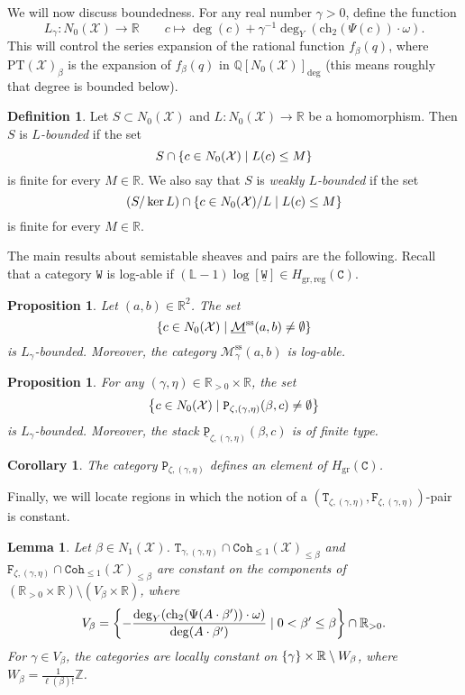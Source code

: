 \documentclass{amsart}
\newtheorem{cor}[thm]{Corollary}
\newtheorem{prop}[thm]{Proposition}
\newtheorem{lem}[thm]{Lemma}
\theoremstyle{definition}
\newtheorem{defn}[thm]{Definition}
\theoremstyle{remark}
\theoremstyle{plain}
\theoremstyle{definition}
\theoremstyle{remark}
\newcommand{\R}{\mathbb{R}}
\newcommand{\Z}{\mathbb{Z}}
\newcommand{\Q}{\mathbb{Q}}
\renewcommand{\L}{\mathbb{L}}
\newcommand{\mc}[1]{\mathcal{#1}}
\newcommand{\mr}[1]{\mathrm{#1}}
\newcommand{\on}[1]{\operatorname{#1}}
\newcommand{\mt}[1]{\mathtt{#1}}
\newcommand{\ul}[1]{\underline{#1}}
\newcommand{\1}{\mathbf{1}}
\newcommand{\2}{\mathbf{2}}
\newcommand{\3}{\mathbf{3}}
\begin{document}
We will now discuss boundedness. For any real number $\gamma > 0$, define the function
\[ L_{\gamma} \colon N_0(\mc{X}) \to \R \qquad c \mapsto \deg(c) + \gamma^{-1} \deg_Y(\on{ch_2}(\Psi(c)) \cdot \omega). \]
This will control the series expansion of the rational function $f_{\beta}(q)$, where $\mr{PT}(\mc{X})_{\beta}$ is the expansion of $f_{\beta}(q)$ in $\Q[N_0(\mc{X})]_{\mr{deg}}$ (this means roughly that degree is bounded below).

\begin{defn}
    Let $S \subset N_0(\mc{X})$ and $L \colon N_0(\mc{X}) \to \R$ be a homomorphism. Then $S$ is \textit{$L$-bounded} if the set
    \[ S \cap \qty{c \in N_0(\mc{X}) \mid L(c) \leq M} \]
    is finite for every $M \in \R$. We also say that $S$ is \textit{weakly $L$-bounded} if the set
    \[ (S/\ker L) \cap \qty{c \in N_0(\mc{X})/L \mid L(c) \leq M} \]
    is finite for every $M \in \R$.
\end{defn}

The main results about semistable sheaves and pairs are the following. Recall that a category $\mt{W}$ is log-able if $(\L-1) \log[\mt{\ul{W}}] \in H_{\mr{gr,reg}}(\mt{C})$.
\begin{prop}
    Let $(a,b) \in \R^2$. The set
    \[ \qty{ c \in N_0(\mc{X}) \mid \ul{\mc{M}}^{\mr{ss}}(a,b) \neq \emptyset} \]
    is $L_{\gamma}$-bounded. Moreover, the category $\mc{M}_{\gamma}^{\mr{ss}}(a, b)$ is log-able.
\end{prop}

\begin{prop}
    For any $(\gamma, \eta) \in \R_{>0} \times \R$, the set
    \[ \qty{c \in N_0(\mc{X}) \mid \mt{P}_{\zeta, (\gamma, \eta)}(\beta, c) \neq \emptyset} \]
    is $L_{\gamma}$-bounded. Moreover, the stack $\mt{\ul{P}}_{\zeta, (\gamma,\eta)}(\beta, c)$ is of finite type.
\end{prop}

\begin{cor}
    The category $\mt{P}_{\zeta, (\gamma, \eta)}$ defines an element of $H_{\mr{gr}}(\mt{C})$.
\end{cor}

Finally, we will locate regions in which the notion of a $(\mt{T}_{\zeta,(\gamma,\eta)}, \mt{F}_{\zeta, (\gamma,\eta)})$-pair is constant.

\begin{lem}
    Let $\beta \in N_1(\mc{X})$. $\mt{T}_{\gamma,(\gamma,\eta)} \cap \mt{Coh}_{\leq 1}(\mc{X})_{\leq \beta}$ and $\mt{F}_{\zeta, (\gamma,\eta)} \cap \mt{Coh}_{\leq 1}(\mc{X})_{\leq \beta}$ are constant on the components of $(\R_{>0} \times \R) \setminus (V_{\beta} \times \R)$, where
    \[ V_{\beta} = \qty{- \frac{\deg_Y(\on{ch}_2(\Psi(A \cdot \beta')) \cdot \omega)}{\deg(A \cdot \beta')} \mid 0 < \beta' \leq \beta} \cap \R_{>0}. \]
    For $\gamma \in V_{\beta}$, the categories are locally constant on $\qty{\gamma} \times \R \setminus W_{\beta}$, where $W_{\beta} = \frac{1}{\ell(\beta)!} \Z$.
\end{lem}
\end{document}
